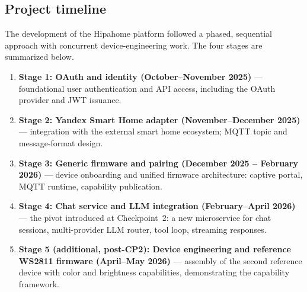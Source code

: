\documentclass[a4paper,12pt]{article}
\begin{document}
\subsection{Project timeline}

The development of the Hipahome platform followed a phased, sequential approach with concurrent device-engineering work. The four stages are summarized below.

\begin{enumerate}
  \item \textbf{Stage 1: OAuth and identity (October--November 2025)} --- foundational user authentication and API access, including the OAuth provider and JWT issuance.
  \item \textbf{Stage 2: Yandex Smart Home adapter (November--December 2025)} --- integration with the external smart home ecosystem; MQTT topic and message-format design.
  \item \textbf{Stage 3: Generic firmware and pairing (December 2025 -- February 2026)} --- device onboarding and unified firmware architecture: captive portal, MQTT runtime, capability publication.
  \item \textbf{Stage 4: Chat service and LLM integration (February--April 2026)} --- the pivot introduced at Checkpoint~2: a new microservice for chat sessions, multi-provider LLM router, tool loop, streaming responses.
  \item \textbf{Stage 5 (additional, post-CP2): Device engineering and reference WS2811 firmware (April--May 2026)} --- assembly of the second reference device with color and brightness capabilities, demonstrating the capability framework.
\end{enumerate}
\end{document}
